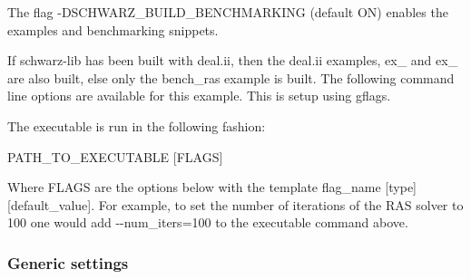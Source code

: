 The flag {\ttfamily -\/\+D\+S\+C\+H\+W\+A\+R\+Z\+\_\+\+B\+U\+I\+L\+D\+\_\+\+B\+E\+N\+C\+H\+M\+A\+R\+K\+I\+NG} (default {\ttfamily ON}) enables the examples and benchmarking snippets.

If {\ttfamily schwarz-\/lib} has been built with {\ttfamily deal.\+ii}, then the {\ttfamily deal.\+ii} examples, {\ttfamily ex\+\_} and {\ttfamily ex\+\_} are also built, else only the {\ttfamily bench\+\_\+ras} example is built. The following command line options are available for this example. This is setup using {\ttfamily gflags}.

The executable is run in the following fashion\+:


\begin{DoxyCode}
 PATH\_TO\_EXECUTABLE [FLAGS]
\end{DoxyCode}


Where {\ttfamily F\+L\+A\+GS} are the options below with the template {\ttfamily flag\+\_\+name \mbox{[}type\mbox{]}\mbox{[}default\+\_\+value\mbox{]}}. For example, to set the number of iterations of the R\+AS solver to 100 one would add {\ttfamily -\/-\/num\+\_\+iters=100} to the executable command above.

\subsubsection*{Generic settings}


